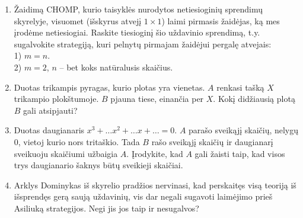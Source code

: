 \begin{enumerate}
  \item Žaidimą CHOMP, kurio taisyklės nurodytos netiesioginių sprendimų
    skyrelyje, visuomet (išskyrus atvejį $1\times 1$) laimi pirmasis
    žaidėjas, ką mes įrodėme netiesiogiai. Raskite tiesioginį šio uždavinio
    sprendimą, t.y. sugalvokite strategiją, kuri pelnytų pirmajam žaidėjui
    pergalę atvejais: \\
    1) $m=n$. \\
    2) $m=2$, $n$ -- bet koks natūralusis skaičius.\\

  \item Duotas trikampis pyragas, kurio plotas yra vienetas. $A$ renkasi tašką
    $X$ trikampio plokštumoje. $B$ pjauna tiese, einančia per $X$. Kokį
    didžiausią plotą $B$ gali atsipjauti?

  \item Duotas daugianaris $x^3+\dots x^2+\dots x+ \dots=0$. $A$ parašo
    sveikąjį skaičių, nelygų $0$, vietoj kurio nors tritaškio. Tada $B$ rašo
    sveikąjį skaičių ir daugianarį sveikuoju skaičiumi užbaigia $A$.
    Įrodykite, kad $A$ gali žaisti taip, kad visos trys daugianario šaknys būtų
    sveikieji skaičiai.

  \item Arklys Dominykas iš skyrelio pradžios nervinasi, kad perskaitęs
    visą teoriją iš išsprendęs gerą saują uždavinių, vis dar negali
    sugavoti laimėjimo prieš Asiliuką strategijos. Negi jis jos taip ir
    nesugalvos?


\end{enumerate}
